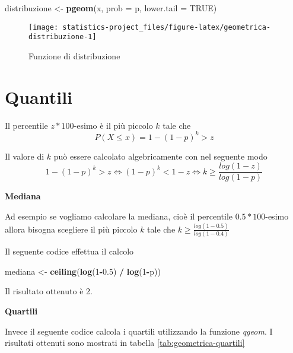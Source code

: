 \documentclass[]{book}
\newenvironment{Shaded}{\begin{snugshade}}{\end{snugshade}}
\newcommand{\KeywordTok}[1]{\textcolor[rgb]{0.13,0.29,0.53}{\textbf{#1}}}
\newcommand{\DataTypeTok}[1]{\textcolor[rgb]{0.13,0.29,0.53}{#1}}
\newcommand{\DecValTok}[1]{\textcolor[rgb]{0.00,0.00,0.81}{#1}}
\newcommand{\FloatTok}[1]{\textcolor[rgb]{0.00,0.00,0.81}{#1}}
\newcommand{\StringTok}[1]{\textcolor[rgb]{0.31,0.60,0.02}{#1}}
\newcommand{\OtherTok}[1]{\textcolor[rgb]{0.56,0.35,0.01}{#1}}
\newcommand{\OperatorTok}[1]{\textcolor[rgb]{0.81,0.36,0.00}{\textbf{#1}}}
\newcommand{\NormalTok}[1]{#1}
\begin{document}
\begin{Shaded}
\begin{Highlighting}[]
\NormalTok{distribuzione <-}\StringTok{ }\KeywordTok{pgeom}\NormalTok{(x, }\DataTypeTok{prob =}\NormalTok{ p, }\DataTypeTok{lower.tail =} \OtherTok{TRUE}\NormalTok{)}
\end{Highlighting}
\end{Shaded}

\begin{figure}

{\centering \texttt{[image: statistics-project\_files/figure-latex/geometrica-distribuzione-1]} 

}

\caption{Funzione di distribuzione}\label{fig:geometrica-distribuzione}
\end{figure}

\section{Quantili}\label{quantili-1}

Il percentile \(z * 100\)-esimo è il più piccolo \(k\) tale che
\[P(X \le x) = 1 - (1 - p)^k > z\]

Il valore di \(k\) può essere calcolato algebricamente con nel seguente
modo
\[1 - (1 - p)^k > z \Leftrightarrow (1 - p)^k < 1 - z \Leftrightarrow k \ge \frac{log{(1 - z)}}{log(1 - p)}\]

\textbf{Mediana}

Ad esempio se vogliamo calcolare la mediana, cioè il percentile
\(0.5 * 100\)-esimo allora bisogna scegliere il più piccolo \(k\) tale
che \(k \ge \frac{log(1-0.5)}{log(1-0.4) }\)

Il seguente codice effettua il calcolo

\begin{Shaded}
\begin{Highlighting}[]
\NormalTok{mediana <-}\StringTok{ }\KeywordTok{ceiling}\NormalTok{(}\KeywordTok{log}\NormalTok{(}\DecValTok{1}\OperatorTok{-}\FloatTok{0.5}\NormalTok{) }\OperatorTok{/}\StringTok{ }\KeywordTok{log}\NormalTok{(}\DecValTok{1}\OperatorTok{-}\NormalTok{p))}
\end{Highlighting}
\end{Shaded}

Il risultato ottenuto è 2.

\textbf{Quartili}

Invece il seguente codice calcola i quartili utilizzando la funzione
\emph{qgeom}. I risultati ottenuti sono mostrati in tabella
\ref{tab:geometrica-quartili}
\end{document}
